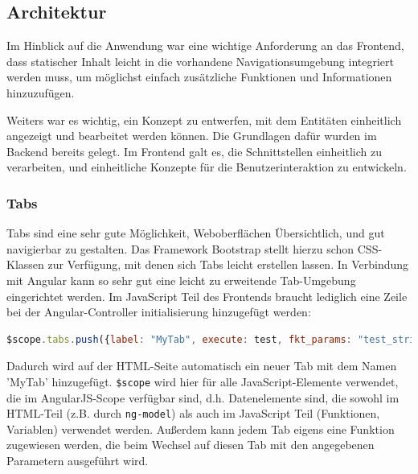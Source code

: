 \subsection{Architektur}

Im Hinblick auf die Anwendung war eine wichtige Anforderung an das Frontend, dass statischer Inhalt leicht in die vorhandene Navigationsumgebung integriert werden muss, um möglichst einfach zusätzliche Funktionen und Informationen hinzuzufügen.

Weiters war es wichtig, ein Konzept zu entwerfen, mit dem Entitäten einheitlich angezeigt und bearbeitet werden können. Die Grundlagen dafür wurden im Backend bereits gelegt. Im Frontend galt es, die Schnittstellen einheitlich zu verarbeiten, und einheitliche Konzepte für die Benutzerinteraktion zu entwickeln.

\subsubsection{Tabs}
Tabs sind eine sehr gute Möglichkeit, Weboberflächen Übersichtlich, und gut navigierbar zu gestalten. Das Framework Bootstrap stellt hierzu schon CSS-Klassen zur Verfügung, mit denen sich Tabs leicht erstellen lassen. In Verbindung mit Angular kann so sehr gut eine leicht zu erweitende Tab-Umgebung eingerichtet werden. Im JavaScript Teil des Frontends braucht lediglich eine Zeile bei der Angular-Controller initialisierung hinzugefügt werden:

\scriptsize
\begin{lstlisting}[language=Javascript]
$scope.tabs.push({label: "MyTab", execute: test, fkt_params: "test_string"});
\end{lstlisting}
\normalsize

Dadurch wird auf der HTML-Seite automatisch ein neuer Tab mit dem Namen 'MyTab' hinzugefügt. \verb|$scope| wird hier für alle JavaScript-Elemente verwendet, die im AngularJS-Scope verfügbar sind, d.h. Datenelemente sind, die sowohl im HTML-Teil (z.B. durch \verb|ng-model|) als auch im JavaScript Teil (Funktionen, Variablen) verwendet werden. Außerdem kann jedem Tab eigens eine Funktion zugewiesen werden, die beim Wechsel auf diesen Tab mit den angegebenen Parametern ausgeführt wird. 

